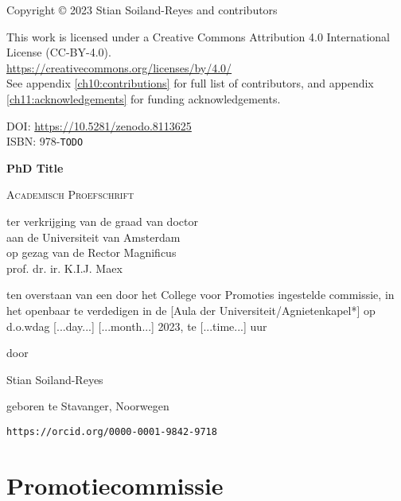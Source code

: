 \newpage

\vspace*{\fill}

Copyright © 2023 Stian Soiland-Reyes and contributors

This work is licensed under a Creative Commons Attribution 4.0 International License (CC-BY-4.0).\\
\url{https://creativecommons.org/licenses/by/4.0/}\\
See appendix \ref{ch10:contributions} for full list of contributors, and appendix \ref{ch11:acknowledgements} for funding acknowledgements.


DOI: \url{https://10.5281/zenodo.8113625}\\
ISBN: 978-\texttt{TODO}

\newpage

\begin{center}

    
\Huge
\textbf{PhD Title}

\vspace*{\fill}

\LARGE
\textsc{Academisch Proefschrift}

\vspace*{\fill}

\large
{ \itshape

ter verkrijging van de graad van doctor\\
aan de Universiteit van Amsterdam\\
op gezag van de Rector Magnificus\\
prof. dr. ir. K.I.J. Maex

ten overstaan van een door het College voor Promoties ingestelde commissie,
in het openbaar te verdedigen in de [Aula der Universiteit/Agnietenkapel*]
op d.o.wdag [...day...] [...month...] 2023, te [...time...] uur

door 
}

\vspace*{\fill}

\LARGE
Stian Soiland-Reyes

\large
geboren te Stavanger, Noorwegen 

\texttt{https://orcid.org/0000-0001-9842-9718} 
\end{center}

\newpage

\section*{Promotiecommissie}

